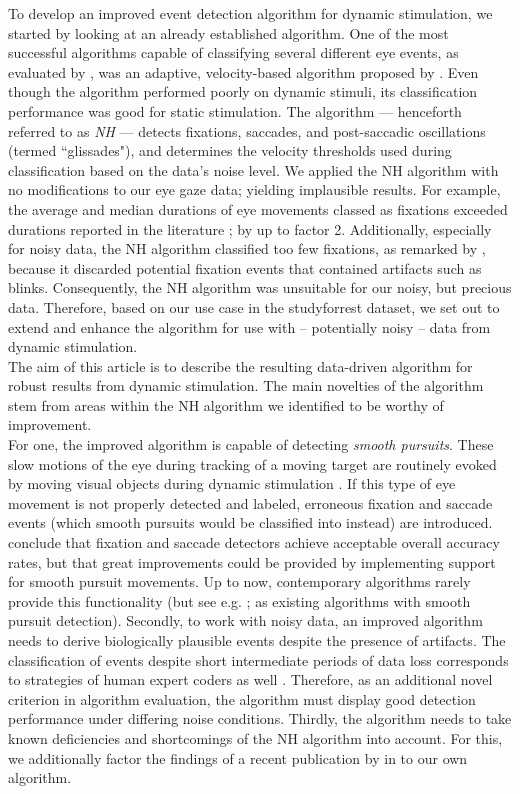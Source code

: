 To develop an improved event detection algorithm for dynamic stimulation, we started by looking at an already established algorithm. One of the most successful algorithms capable of classifying several different eye events, as evaluated by \citet{Andersson2017}, was an adaptive, velocity-based algorithm proposed by \citet{Nystrom2010AnData}. Even though the algorithm performed poorly on dynamic stimuli, its classification performance was good for static stimulation. The algorithm --- henceforth referred to as \textit{NH} --- detects fixations, saccades, and post-saccadic oscillations (termed ``glissades"), and determines the velocity thresholds used during classification based on the data's noise level. We applied the NH algorithm with no modifications to our eye gaze data; yielding implausible results. For example, the average and median durations of eye movements classed as fixations exceeded durations reported in the literature \citep{holmqvist2011eye,dorr2010variability};
by up to factor 2. Additionally, especially for noisy data, the NH algorithm classified too few fixations, as remarked by \citet{Friedman2018}, because it discarded potential fixation events that contained artifacts such as blinks. Consequently, the NH algorithm was unsuitable for our noisy, but precious data. Therefore, based on our use case in the studyforrest dataset, we set out to extend and enhance the algorithm for use with -- potentially noisy -- data from dynamic stimulation. \\
The aim of this article is to describe the resulting data-driven algorithm for robust results from dynamic stimulation. The main novelties of the algorithm stem from areas within the NH algorithm we identified to be worthy of improvement. \\
For one, the improved algorithm is capable of detecting \textit{smooth pursuits}. These slow motions of the eye during tracking of a moving target are routinely evoked by moving visual objects during dynamic stimulation \citep{carl1987pursuits}. If this type of eye movement is not properly detected and labeled, erroneous fixation and saccade events (which smooth pursuits would be classified into instead)  are introduced. \cite{Andersson2017} conclude that fixation and saccade detectors achieve acceptable overall accuracy rates, but that great improvements could be provided by implementing support for smooth pursuit movements. Up to now, contemporary algorithms rarely provide this functionality (but see e.g. \cite{LARSSON2015145}; \cite{Komogortsev2013} as existing algorithms with smooth pursuit detection). Secondly, to work with noisy data, an improved algorithm needs to derive biologically plausible events despite the presence of artifacts. The classification of events despite short intermediate periods of data loss corresponds to strategies of human expert coders as well \citep{Hooge2018}. Therefore, as an additional novel criterion in algorithm evaluation, the algorithm must display good detection performance under differing noise conditions. Thirdly, the algorithm needs to take known deficiencies and shortcomings of the NH algorithm into account. For this, we additionally factor the findings of a recent publication by \cite{Friedman2018} in to our own algorithm. \\
